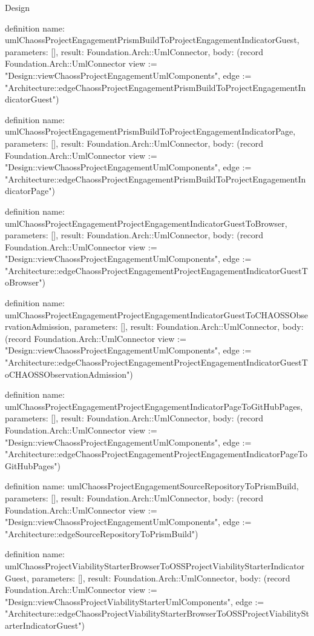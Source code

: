 \begin{lexlean}{Design}
\begin{semanticmodule}
definition{
  name: umlChaossProjectEngagementPrismBuildToProjectEngagementIndicatorGuest,
  parameters: [],
  result: Foundation.Arch::UmlConnector,
  body: (record Foundation.Arch::UmlConnector {view := "Design::viewChaossProjectEngagementUmlComponents", edge := "Architecture::edgeChaossProjectEngagementPrismBuildToProjectEngagementIndicatorGuest"})
}

definition{
  name: umlChaossProjectEngagementPrismBuildToProjectEngagementIndicatorPage,
  parameters: [],
  result: Foundation.Arch::UmlConnector,
  body: (record Foundation.Arch::UmlConnector {view := "Design::viewChaossProjectEngagementUmlComponents", edge := "Architecture::edgeChaossProjectEngagementPrismBuildToProjectEngagementIndicatorPage"})
}

definition{
  name: umlChaossProjectEngagementProjectEngagementIndicatorGuestToBrowser,
  parameters: [],
  result: Foundation.Arch::UmlConnector,
  body: (record Foundation.Arch::UmlConnector {view := "Design::viewChaossProjectEngagementUmlComponents", edge := "Architecture::edgeChaossProjectEngagementProjectEngagementIndicatorGuestToBrowser"})
}

definition{
  name: umlChaossProjectEngagementProjectEngagementIndicatorGuestToCHAOSSObservationAdmission,
  parameters: [],
  result: Foundation.Arch::UmlConnector,
  body: (record Foundation.Arch::UmlConnector {view := "Design::viewChaossProjectEngagementUmlComponents", edge := "Architecture::edgeChaossProjectEngagementProjectEngagementIndicatorGuestToCHAOSSObservationAdmission"})
}

definition{
  name: umlChaossProjectEngagementProjectEngagementIndicatorPageToGitHubPages,
  parameters: [],
  result: Foundation.Arch::UmlConnector,
  body: (record Foundation.Arch::UmlConnector {view := "Design::viewChaossProjectEngagementUmlComponents", edge := "Architecture::edgeChaossProjectEngagementProjectEngagementIndicatorPageToGitHubPages"})
}

definition{
  name: umlChaossProjectEngagementSourceRepositoryToPrismBuild,
  parameters: [],
  result: Foundation.Arch::UmlConnector,
  body: (record Foundation.Arch::UmlConnector {view := "Design::viewChaossProjectEngagementUmlComponents", edge := "Architecture::edgeSourceRepositoryToPrismBuild"})
}

definition{
  name: umlChaossProjectViabilityStarterBrowserToOSSProjectViabilityStarterIndicatorGuest,
  parameters: [],
  result: Foundation.Arch::UmlConnector,
  body: (record Foundation.Arch::UmlConnector {view := "Design::viewChaossProjectViabilityStarterUmlComponents", edge := "Architecture::edgeChaossProjectViabilityStarterBrowserToOSSProjectViabilityStarterIndicatorGuest"})
}


\end{semanticmodule}
\end{lexlean}
